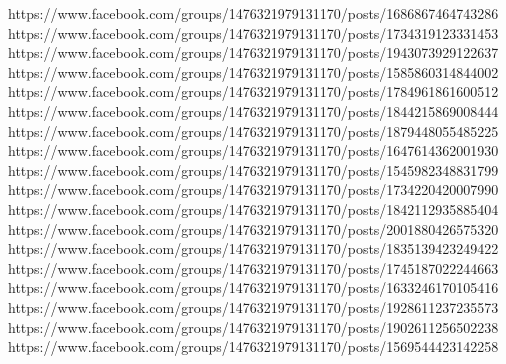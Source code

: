  
 
 
 
 



https://www.facebook.com/groups/1476321979131170/posts/1686867464743286
https://www.facebook.com/groups/1476321979131170/posts/1734319123331453
https://www.facebook.com/groups/1476321979131170/posts/1943073929122637
https://www.facebook.com/groups/1476321979131170/posts/1585860314844002
https://www.facebook.com/groups/1476321979131170/posts/1784961861600512
https://www.facebook.com/groups/1476321979131170/posts/1844215869008444
https://www.facebook.com/groups/1476321979131170/posts/1879448055485225
https://www.facebook.com/groups/1476321979131170/posts/1647614362001930
https://www.facebook.com/groups/1476321979131170/posts/1545982348831799
https://www.facebook.com/groups/1476321979131170/posts/1734220420007990
https://www.facebook.com/groups/1476321979131170/posts/1842112935885404
https://www.facebook.com/groups/1476321979131170/posts/2001880426575320
https://www.facebook.com/groups/1476321979131170/posts/1835139423249422
https://www.facebook.com/groups/1476321979131170/posts/1745187022244663
https://www.facebook.com/groups/1476321979131170/posts/1633246170105416
https://www.facebook.com/groups/1476321979131170/posts/1928611237235573
https://www.facebook.com/groups/1476321979131170/posts/1902611256502238
https://www.facebook.com/groups/1476321979131170/posts/1569544423142258
